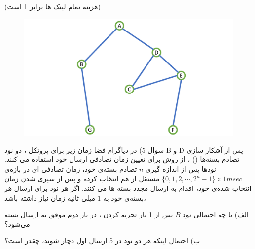 \documentclass[10pt,letterpaper]{article}
\begin{document}
(هزینه تمام لینک ها برابر 1 است)
\begin{figure}[htb]
\centering
\includegraphics[width=130mm]{broadcast.pdf}
\end{figure}
\newpage
سوال 5) در دیاگرام فضا-زمان زیر برای پروتکل
، دو نود B و D پس از آشکار سازی تصادم بسته‌ها 
()
، از روش 
برای تعیین زمان تصادفی ارسال خود استفاده می کنند. نودها پس از اندازه گیری 
$
n
$
تصادم بسته‌ی خود، زمان تصادفی ای در بازه‌ی 
$
\{0,1,2,\cdots,2^{n}-1\}\times 1msec
$
مستقل از هم انتخاب کرده و پس از سپری شدن زمان انتخاب شده‌ی خود، اقدام به ارسال مجدد بسته ها می کنند. اگر هر نود برای ارسال هر بسته‌ی خود به 1 میلی ثانیه زمان نیاز داشته باشد،

الف) 
با چه احتمالی نود $B$ پس از 1 بار تجربه کردن
،  در بار دوم موفق به ارسال بسته می‌شود؟

ب) احتمال اینکه هر دو نود در 5 ارسال اول دچار 
شوند، چقدر است؟
\end{document}
